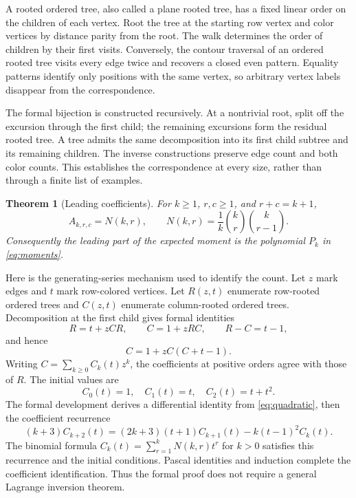 \documentclass[11pt]{article}
\newtheorem{theorem}{Theorem}[section]
\theoremstyle{remark}
\begin{document}
A rooted ordered tree, also called a plane rooted tree, has a fixed linear order on the children of each vertex. Root the tree at the starting row vertex and color vertices by distance parity from the root. The walk determines the order of children by their first visits. Conversely, the contour traversal of an ordered rooted tree visits every edge twice and recovers a closed even pattern. Equality patterns identify only positions with the same vertex, so arbitrary vertex labels disappear from the correspondence.

The formal bijection is constructed recursively. At a nontrivial root, split off the excursion through the first child; the remaining excursions form the residual rooted tree. A tree admits the same decomposition into its first child subtree and its remaining children. The inverse constructions preserve edge count and both color counts. This establishes the correspondence at every size, rather than through a finite list of examples.

\begin{theorem}[Leading coefficients]\label{thm:narayana}
For $k\geq1$, $r,c\geq1$, and $r+c=k+1$,
\[
 A_{k,r,c}=N(k,r),\qquad N(k,r)=\frac1k\binom{k}{r}\binom{k}{r-1}.
\]
Consequently the leading part of the expected moment is the polynomial $P_k$ in \eqref{eq:moments}.
\end{theorem}

Here is the generating-series mechanism used to identify the count. Let $z$ mark edges and $t$ mark row-colored vertices. Let $R(z,t)$ enumerate row-rooted ordered trees and $C(z,t)$ enumerate column-rooted ordered trees. Decomposition at the first child gives formal identities
\[
 R=t+zCR,\qquad C=1+zRC,\qquad R-C=t-1,
\]
and hence
\begin{equation}\label{eq:quadratic}
 C=1+zC(C+t-1).
\end{equation}
Writing $C=\sum_{k\geq0}C_k(t)z^k$, the coefficients at positive orders agree with those of $R$. The initial values are
\[
 C_0(t)=1,\quad C_1(t)=t,\quad C_2(t)=t+t^2.
\]
The formal development derives a differential identity from \eqref{eq:quadratic}, then the coefficient recurrence
\begin{equation}\label{eq:tree-recurrence}
 (k+3)C_{k+2}(t)=(2k+3)(t+1)C_{k+1}(t)-k(t-1)^2C_k(t).
\end{equation}
The binomial formula $C_k(t)=\sum_{r=1}^kN(k,r)t^r$ for $k>0$ satisfies this recurrence and the initial conditions. Pascal identities and induction complete the coefficient identification. Thus the formal proof does not require a general Lagrange inversion theorem.
\end{document}

